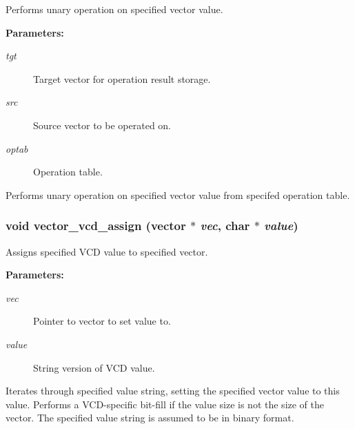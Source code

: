 Performs unary operation on specified vector value.

\begin{Desc}
\item[{\bf Parameters: }]\par
\begin{description}
\item[
{\em tgt}]Target vector for operation result storage. \item[
{\em src}]Source vector to be operated on. \item[
{\em optab}]Operation table.

\end{description}
\end{Desc}
Performs unary operation on specified vector value from specifed operation table. 
\subsubsection{\setlength{\rightskip}{0pt plus 5cm}void vector\_\-vcd\_\-assign ({\bf vector} $\ast$ {\em vec}, char $\ast$ {\em value})}\label{vector_8h_a19}


Assigns specified VCD value to specified vector.

\begin{Desc}
\item[{\bf Parameters: }]\par
\begin{description}
\item[
{\em vec}]Pointer to vector to set value to. \item[
{\em value}]String version of VCD value.

\end{description}
\end{Desc}
Iterates through specified value string, setting the specified vector value to this value. Performs a VCD-specific bit-fill if the value size is not the size of the vector. The specified value string is assumed to be in binary format. 